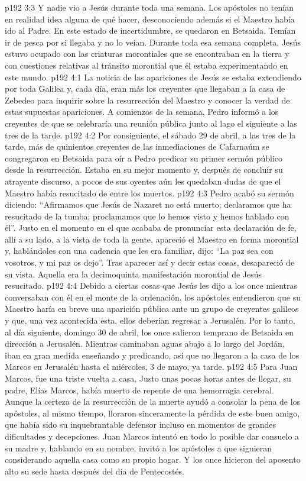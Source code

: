 \vs p192 3:3 \pc Y nadie vio a Jesús durante toda una semana. Los apóstoles no tenían en realidad idea alguna de qué hacer, desconociendo además si el Maestro había ido al Padre. En este estado de incertidumbre, se quedaron en Betsaida. Temían ir de pesca por si llegaba y no lo veían. Durante toda esa semana completa, Jesús estuvo ocupado con las criaturas morontiales que se encontraban en la tierra y con cuestiones relativas al tránsito morontial que él estaba experimentando en este mundo.
\vs p192 4:1 La noticia de las apariciones de Jesús se estaba extendiendo por toda Galilea y, cada día, eran más los creyentes que llegaban a la casa de Zebedeo para inquirir sobre la resurrección del Maestro y conocer la verdad de estas supuestas apariciones. A comienzos de la semana, Pedro informó a los creyentes de que se celebraría una reunión pública junto al lago el siguiente  a las tres de la tarde.
\vs p192 4:2 Por consiguiente, el sábado 29 de abril, a las tres de la tarde, más de quinientos creyentes de las inmediaciones de Cafarnaúm se congregaron en Betsaida para oír a Pedro predicar su primer sermón público desde la resurrección. Estaba en su mejor momento y, después de concluir su atrayente discurso, a pocos de sus oyentes aún les quedaban dudas de que el Maestro había resucitado de entre los muertos.
\vs p192 4:3 Pedro acabó su sermón diciendo: “Afirmamos que Jesús de Nazaret no está muerto; declaramos que ha resucitado de la tumba; proclamamos que lo hemos visto y hemos hablado con él”. Justo en el momento en el que acababa de pronunciar esta declaración de fe, allí a su lado, a la vista de toda la gente, apareció el Maestro en forma morontial y, hablándoles con una cadencia que les era familiar, dijo: “La paz sea con vosotros, y mi paz os dejo”. Tras aparecer así y decir estas cosas, desapareció de su vista. Aquella era la decimoquinta manifestación morontial de Jesús resucitado.
\vs p192 4:4 \pc Debido a ciertas cosas que Jesús les dijo a los once mientras conversaban con él en el monte de la ordenación, los apóstoles entendieron que su Maestro haría en breve una aparición pública ante un grupo de creyentes galileos y que, una vez acontecida esta, ellos deberían regresar a Jerusalén. Por lo tanto, al día siguiente, domingo 30 de abril, los once salieron temprano de Betsaida en dirección a Jerusalén. Mientras caminaban aguas abajo a lo largo del Jordán, iban en gran medida enseñando y predicando, así que no llegaron a la casa de los Marcos en Jerusalén hasta el miércoles, 3 de mayo, ya tarde.
\vs p192 4:5 \pc Para Juan Marcos, fue una triste vuelta a casa. Justo unas pocas horas antes de llegar, su padre, Elías Marcos, había muerto de repente de una hemorragia cerebral. Aunque la certeza de la resurrección de la muerte ayudó a consolar la pena de los apóstoles, al mismo tiempo, lloraron sinceramente la pérdida de este buen amigo, que había sido su inquebrantable defensor incluso en momentos de grandes dificultades y decepciones. Juan Marcos intentó en todo lo posible dar consuelo a su madre y, hablando en su nombre, invitó a los apóstoles a que siguieran considerando aquella casa como su propio hogar. Y los once hicieron del aposento alto su sede hasta después del día de Pentecostés.
